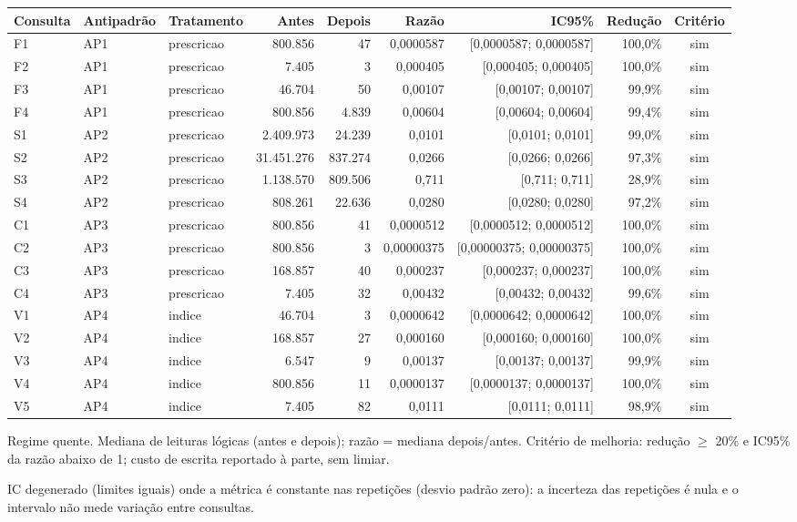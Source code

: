 {\small\setlength{\tabcolsep}{4pt}
\begin{tabular}{lllrrrrrc}
\toprule
Consulta & Antipadrão & Tratamento & Antes & Depois & Razão & IC95\% & Redução & Critério \\
\midrule
F1 & AP1 & prescricao & 800.856 & 47 & 0,0000587 & [0,0000587; 0,0000587] & 100,0\% & sim \\
F2 & AP1 & prescricao & 7.405 & 3 & 0,000405 & [0,000405; 0,000405] & 100,0\% & sim \\
F3 & AP1 & prescricao & 46.704 & 50 & 0,00107 & [0,00107; 0,00107] & 99,9\% & sim \\
F4 & AP1 & prescricao & 800.856 & 4.839 & 0,00604 & [0,00604; 0,00604] & 99,4\% & sim \\
S1 & AP2 & prescricao & 2.409.973 & 24.239 & 0,0101 & [0,0101; 0,0101] & 99,0\% & sim \\
S2 & AP2 & prescricao & 31.451.276 & 837.274 & 0,0266 & [0,0266; 0,0266] & 97,3\% & sim \\
S3 & AP2 & prescricao & 1.138.570 & 809.506 & 0,711 & [0,711; 0,711] & 28,9\% & sim \\
S4 & AP2 & prescricao & 808.261 & 22.636 & 0,0280 & [0,0280; 0,0280] & 97,2\% & sim \\
C1 & AP3 & prescricao & 800.856 & 41 & 0,0000512 & [0,0000512; 0,0000512] & 100,0\% & sim \\
C2 & AP3 & prescricao & 800.856 & 3 & 0,00000375 & [0,00000375; 0,00000375] & 100,0\% & sim \\
C3 & AP3 & prescricao & 168.857 & 40 & 0,000237 & [0,000237; 0,000237] & 100,0\% & sim \\
C4 & AP3 & prescricao & 7.405 & 32 & 0,00432 & [0,00432; 0,00432] & 99,6\% & sim \\
V1 & AP4 & indice & 46.704 & 3 & 0,0000642 & [0,0000642; 0,0000642] & 100,0\% & sim \\
V2 & AP4 & indice & 168.857 & 27 & 0,000160 & [0,000160; 0,000160] & 100,0\% & sim \\
V3 & AP4 & indice & 6.547 & 9 & 0,00137 & [0,00137; 0,00137] & 99,9\% & sim \\
V4 & AP4 & indice & 800.856 & 11 & 0,0000137 & [0,0000137; 0,0000137] & 100,0\% & sim \\
V5 & AP4 & indice & 7.405 & 82 & 0,0111 & [0,0111; 0,0111] & 98,9\% & sim \\
\bottomrule
\end{tabular}\par
\vspace{3pt}
\begin{minipage}{\linewidth}\footnotesize
Regime quente. Mediana de leituras lógicas (antes e depois); razão = mediana depois/antes. Critério de melhoria: redução $\geq$ 20\% e IC95\% da razão abaixo de 1; custo de escrita reportado à parte, sem limiar.\par
IC degenerado (limites iguais) onde a métrica é constante nas repetições (desvio padrão zero): a incerteza das repetições é nula e o intervalo não mede variação entre consultas.
\end{minipage}
}
